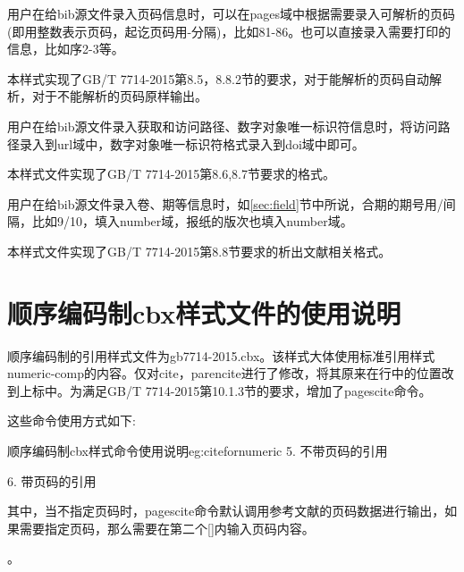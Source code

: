 \begin{property}{}{}
用户在给bib源文件录入页码信息时，可以在pages域中根据需要录入可解析的页码(即用整数表示页码，起讫页码用-分隔)，比如81-86。也可以直接录入需要打印的信息，比如序2-3等。

本样式实现了GB/T 7714-2015第8.5，8.8.2节的要求，对于能解析的页码自动解析，对于不能解析的页码原样输出。
\end{property}


\begin{property}{}{}
用户在给bib源文件录入获取和访问路径、数字对象唯一标识符信息时，将访问路径录入到url域中，数字对象唯一标识符格式录入到doi域中即可。

本样式文件实现了GB/T 7714-2015第8.6,8.7节要求的格式。
\end{property}

\begin{property}{}{}
用户在给bib源文件录入卷、期等信息时，如\ref{sec:field}节中所说，合期的期号用/间隔，比如9/10，填入number域，报纸的版次也填入number域。

本样式文件实现了GB/T 7714-2015第8.8节要求的析出文献相关格式。
\end{property}

\section{顺序编码制cbx样式文件的使用说明}\label{sec:cbx:usage}

顺序编码制的引用样式文件为gb7714-2015.cbx。该样式大体使用标准引用样式numeric-comp的内容。仅对cite，parencite进行了修改，将其原来在行中的位置改到上标中。为满足GB/T 7714-2015第10.1.3节的要求，增加了pagescite命令。

这些命令使用方式如下:

\begin{codetex}{顺序编码制cbx样式命令使用说明}{eg:citefornumeric}
5. 不带页码的引用\cite{Peebles2001-100-100}\parencite{Miroslav2004--}

6. 带页码的引用\cite[见][49页]{蔡敏2006--}\parencite[见][49页]{Miroslav2004--}
\end{codetex}

其中，当不指定页码时，pagescite命令默认调用参考文献的页码数据进行输出，如果需要指定页码，那么需要在第二个[]内输入页码内容。

。

